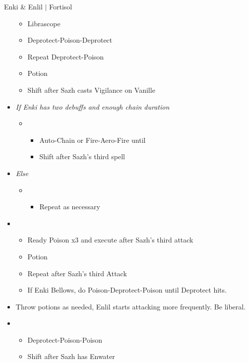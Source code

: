 \begin{battle}[1:41 $|$ 1:30]{Enki \& Enlil $|$ Fortisol}
\begin{multicols}{2}
\begin{itemize}
\begin{itemize}
				      \item Librascope
				      \item Deprotect-Poison-Deprotect
				      \item Repeat Deprotect-Poison
				      \item Potion
				      \item Shift after Sazh casts Vigilance on Vanille
			      \end{itemize}
			\item \textit{If Enki has two debuffs and enough chain duration}
			      \begin{itemize}
				      \item \fourth
				            \begin{itemize}
					            \item Auto-Chain or Fire-Aero-Fire until \stagger
					            \item Shift after Sazh's third spell
				            \end{itemize}
			      \end{itemize}
			\item \textit{Else}
			      \begin{itemize}
				      \item \fifth
				            \begin{itemize}
					            \item Repeat as necessary
				            \end{itemize}
			      \end{itemize}
			\item \sixth
			      \begin{itemize}
				      \item Ready Poison x3 and execute after Sazh's third attack
				      \item Potion
				      \item Repeat after Sazh's third Attack
				      \item If Enki Bellows, do Poison-Deprotect-Poison until Deprotect hits.
			      \end{itemize}
			\item Throw potions as needed, Enlil starts attacking more frequently. Be liberal.
			\item \third
			      \begin{itemize}
				      \item Deprotect-Poison-Poison
				      \item Shift after Sazh has Enwater
			      \end{itemize}

\end{itemize}
\end{multicols}
\end{battle}
